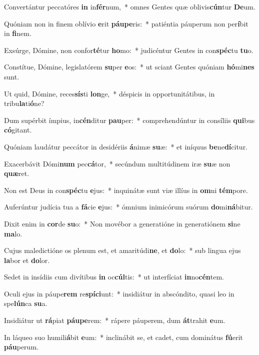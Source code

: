 \item Convertántur peccatóres \textbf{in} in\textbf{fér}num,~* omnes Gentes quæ oblivis\textbf{cún}tur \textbf{De}um.
\item Quóniam non in finem oblívio \textbf{e}rit \textbf{páu}\textbf{pe}ris:~* patiéntia páuperum non per\textbf{í}bit in \textbf{fi}nem.
\item Exsúrge, Dómine, non confor\textbf{té}tur \textbf{ho}mo:~* judicéntur Gentes in con\textbf{spéc}tu \textbf{tu}o.
\item Constítue, Dómine, legislatórem \textbf{su}per \textbf{e}os:~* ut sciant Gentes quóniam \textbf{hó}mi\textbf{nes} sunt.
\item Ut quid, Dómine, reces\textbf{sís}ti \textbf{lon}ge,~* déspicis in opportunitátibus, in tribu\textbf{la}ti\textbf{ó}ne?
\item Dum supérbit ímpius, in\textbf{cén}ditur \textbf{pau}per:~* comprehendúntur in consíliis \textbf{qui}bus \textbf{có}gitant.
\item Quóniam laudátur peccátor in desidériis \textbf{á}nimæ \textbf{su}æ:~* et iníquus \textbf{be}ne\textbf{dí}citur.
\item Exacerbávit Dómi\textbf{num} pec\textbf{cá}tor,~* secúndum multitúdinem iræ \textbf{su}æ non \textbf{quæ}ret.
\item Non est Deus in con\textbf{spéc}tu \textbf{e}jus:~* inquinátæ sunt viæ illíus in \textbf{om}ni \textbf{tém}pore.
\item Auferúntur judícia tua a \textbf{fá}cie \textbf{e}jus:~* ómnium inimicórum suórum \textbf{do}mi\textbf{ná}bitur.
\item Dixit enim in \textbf{cor}de \textbf{su}o:~* Non movébor a generatióne in generatiónem \textbf{si}ne \textbf{ma}lo.
\item Cujus maledictióne os plenum est, et amaritúdi\textbf{ne}, et \textbf{do}lo:~* sub lingua ejus \textbf{la}bor et \textbf{do}lor.
\item Sedet in insídiis cum divítibus \textbf{in} oc\textbf{cúl}tis:~* ut interfíciat \textbf{in}no\textbf{cén}tem.
\item Oculi ejus in páupe\textbf{rem} re\textbf{spí}\textbf{ci}unt:~* insidiátur in abscóndito, quasi leo in spe\textbf{lún}ca \textbf{su}a.
\item Insidiátur ut \textbf{rá}piat \textbf{páu}\textbf{pe}rem:~* rápere páuperem, dum \textbf{át}trahit \textbf{e}um.
\item In láqueo suo humili\textbf{á}bit \textbf{e}um:~* inclinábit se, et cadet, cum dominátus \textbf{fú}erit \textbf{páu}perum.
